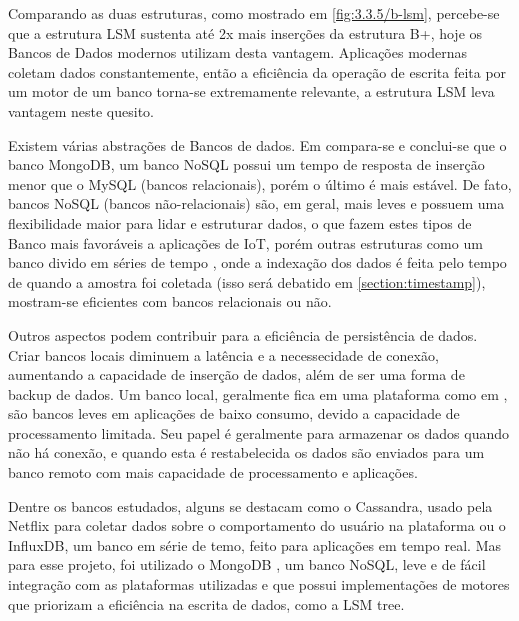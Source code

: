 Comparando as duas estruturas, como mostrado em \ref{fig:3.3.5/b-lsm}, percebe-se que a estrutura LSM sustenta até 2x mais inserções da estrutura B+, hoje os Bancos de Dados modernos utilizam desta vantagem. Aplicações modernas coletam dados constantemente, então a eficiência da operação de escrita feita por um motor de um banco torna-se extremamente relevante, a estrutura LSM leva vantagem neste quesito.

Existem várias abstrações de Bancos de dados. Em \cite{Rautmare-Bhalerao} compara-se e conclui-se que o banco MongoDB, um banco NoSQL possui um tempo de resposta de inserção menor que o MySQL (bancos relacionais), porém o último é mais estável. De fato, bancos NoSQL (bancos não-relacionais) são, em geral, mais leves e possuem uma flexibilidade maior para lidar e estruturar dados, o que fazem estes tipos de Banco mais favoráveis a aplicações de IoT, porém outras estruturas como um banco divido em séries de tempo \cite{timeseries} , onde a indexação dos dados é feita pelo tempo de quando a amostra foi coletada (isso será debatido em \ref{section:timestamp}), mostram-se eficientes com bancos relacionais ou não.

Outros aspectos podem contribuir para a eficiência de persistência de dados. Criar bancos locais diminuem a latência e a necessecidade de conexão, aumentando a capacidade de inserção de dados, além de ser uma forma de backup de dados. Um banco local, geralmente fica em uma plataforma como em \cite{Paethong-Sato-Namiki}, são bancos leves em aplicações de baixo consumo, devido a capacidade de processamento limitada. Seu papel é geralmente para armazenar os dados quando não há conexão, e quando esta é restabelecida os dados são enviados para um banco remoto com mais capacidade de processamento e aplicações. %

Dentre os bancos estudados, alguns se destacam como o Cassandra, usado pela Netflix para coletar dados sobre o comportamento do usuário na plataforma ou o InfluxDB, um banco em série de temo, feito para aplicações em tempo real. Mas para esse projeto, foi utilizado o MongoDB \cite{mongodb}, um banco NoSQL, leve e de fácil integração com as plataformas utilizadas e que possui implementações de motores que priorizam a eficiência na escrita de dados, como a LSM tree.




